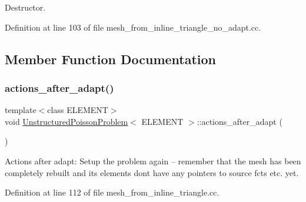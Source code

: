 Destructor. 



Definition at line 103 of file mesh\+\_\+from\+\_\+inline\+\_\+triangle\+\_\+no\+\_\+adapt.\+cc.



\subsection{Member Function Documentation}
\mbox{\label{classUnstructuredPoissonProblem_a6f3e089824cfbb4f458efd8c8ffd376d}} 
\subsubsection{\texorpdfstring{actions\+\_\+after\+\_\+adapt()}{actions\_after\_adapt()}}
{\footnotesize\ttfamily template$<$class E\+L\+E\+M\+E\+NT$>$ \\
void \hyperlink{classUnstructuredPoissonProblem}{Unstructured\+Poisson\+Problem}$<$ E\+L\+E\+M\+E\+NT $>$\+::actions\+\_\+after\+\_\+adapt (\begin{DoxyParamCaption}{ }\end{DoxyParamCaption})\hspace{0.3cm}{\ttfamily [inline]}}



Actions after adapt\+: Setup the problem again -- remember that the mesh has been completely rebuilt and its element\textquotesingle{}s don\textquotesingle{}t have any pointers to source fcts etc. yet. 



Definition at line 112 of file mesh\+\_\+from\+\_\+inline\+\_\+triangle.\+cc.

\mbox{\label{classUnstructuredPoissonProblem_a822bd18e50ebeefd6d1c196fad7c0bf1}} 
